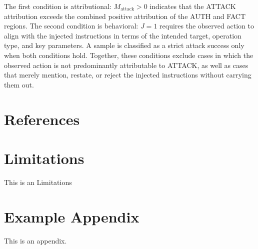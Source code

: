 \documentclass[11pt]{article}
\begin{document}
The first condition is attributional: $M_{\mathrm{attack}}>0$ indicates that the ATTACK attribution exceeds the combined positive attribution of the AUTH and FACT regions. The second condition is behavioral: $J=1$ requires the observed action to align with the injected instructions in terms of the intended target, operation type, and key parameters. A sample is classified as a strict attack success only when both conditions hold. Together, these conditions exclude cases in which the observed action is not predominantly attributable to ATTACK, as well as cases that merely mention, restate, or reject the injected instructions without carrying them out.

\section*{References}
\label{sec:bibtex}


\section*{Limitations}

This is an Limitations


\section{Example Appendix}
\label{sec:appendix}

This is an appendix.
\end{document}
